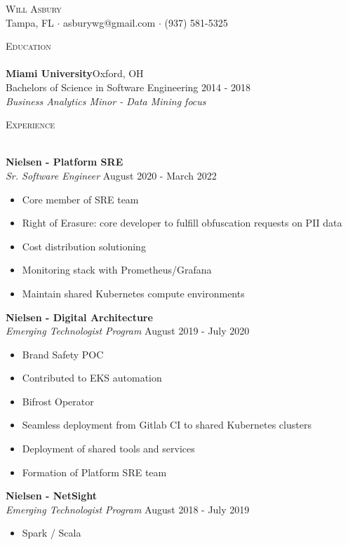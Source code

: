 \documentclass[a4paper]{article}
\newcommand{\lineunder} {
    \vspace*{-8pt} \\
    \hspace*{-18pt} \hrulefill \\
}
\newcommand{\header} [1] {
    {\hspace*{-18pt}\vspace*{6pt} \textsc{#1}}
    \vspace*{-6pt} \lineunder
}
\begin{document}
\vspace*{-40pt}

    

\vspace*{-10pt}
\begin{center}
	{\Huge \scshape {Will Asbury}}\\
	Tampa, FL $\cdot$ asburywg@gmail.com $\cdot$ (937) 581-5325\\
\end{center}

\header{Education}
\textbf{Miami University}\hfill Oxford, OH\\
Bachelors of Science in Software Engineering \hfill 2014 - 2018\\
\textit{Business Analytics Minor - Data Mining focus}\\
\vspace{3mm}

\header{Experience}
\vspace{1mm}

\textbf{Nielsen - Platform SRE}\\
\textit{Sr. Software Engineer} \hfill August 2020 - March 2022\\
\vspace{-1mm}
\begin{itemize} \itemsep 1pt
	\item Core member of SRE team
	\item Right of Erasure: core developer to fulfill obfuscation requests on PII data
	\item Cost distribution solutioning
	\item Monitoring stack with Prometheus/Grafana
	\item Maintain shared Kubernetes compute environments
\end{itemize}
\textbf{Nielsen - Digital Architecture}\\
\textit{Emerging Technologist Program} \hfill August 2019 - July 2020\\
\vspace{-1mm}
\begin{itemize} \itemsep 1pt
	\item Brand Safety POC
	\item Contributed to EKS automation
	\item Bifrost Operator
	\item Seamless deployment from Gitlab CI to shared Kubernetes clusters
	\item Deployment of shared tools and services
	\item Formation of Platform SRE team
\end{itemize}
\textbf{Nielsen - NetSight}\\
\textit{Emerging Technologist Program} \hfill August 2018 - July 2019\\
\vspace{-1mm}
\begin{itemize} \itemsep 1pt
	\item Spark / Scala
\end{itemize}
\end{document}
